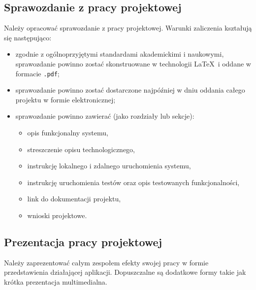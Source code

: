\documentclass{article}
\begin{document}
	\subsection{Sprawozdanie z pracy projektowej}
	Należy opracować sprawozdanie z pracy projektowej. Warunki zaliczenia kształują się następująco:
	\begin{itemize}
		\item zgodnie z ogólnoprzyjętymi standardami akademickimi i naukowymi, sprawozdanie powinno zostać skonstruowane w technologii \LaTeX \ i oddane w formacie \texttt{.pdf};
		\item sprawozdanie powinno zostać dostarczone najpóźniej w dniu oddania całego projektu w formie elektronicznej;
		\item sprawozdanie powinno zawierać (jako rozdziały lub sekcje):
		\begin{itemize}
			\item opis funkcjonalny systemu,
			\item streszczenie opisu technologicznego,
			\item instrukcję lokalnego i zdalnego uruchomienia systemu,
			\item instrukcję uruchomienia testów oraz opis testowanych funkcjonalności,
			\item link do dokumentacji projektu,
			\item wnioski projektowe.
		\end{itemize}
	\end{itemize}

	\subsection{Prezentacja pracy projektowej}
	Należy zaprezentować całym zespołem efekty swojej pracy w formie przedstawienia działającej aplikacji. Dopuszczalne są dodatkowe formy takie jak krótka prezentacja multimedialna.
\end{document}
